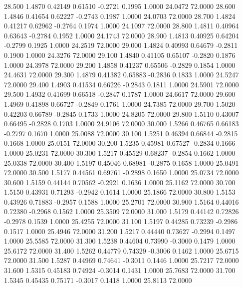   28.500   1.4870   0.42149   0.61510  -0.2721   0.1995   1.0000  24.0472  72.0000
  28.600   1.4846   0.41654   0.62227  -0.2743   0.1987   1.0000  24.0703  72.0000
  28.700   1.4824   0.41217   0.62962  -0.2764   0.1974   1.0000  24.1097  72.0000
  28.800   1.4811   0.40964   0.63643  -0.2784   0.1952   1.0000  24.1743  72.0000
  28.900   1.4813   0.40925   0.64204  -0.2799   0.1925   1.0000  24.2519  72.0000
  29.000   1.4824   0.40993   0.64679  -0.2811   0.1900   1.0000  24.3276  72.0000
  29.100   1.4840   0.41105   0.65107  -0.2820   0.1876   1.0000  24.3978  72.0000
  29.200   1.4858   0.41237   0.65506  -0.2829   0.1854   1.0000  24.4631  72.0000
  29.300   1.4879   0.41382   0.65883  -0.2836   0.1833   1.0000  24.5247  72.0000
  29.400   1.4903   0.41534   0.66226  -0.2843   0.1811   1.0000  24.5901  72.0000
  29.500   1.4932   0.41699   0.66518  -0.2847   0.1787   1.0000  24.6617  72.0000
  29.600   1.4969   0.41898   0.66727  -0.2849   0.1761   1.0000  24.7385  72.0000
  29.700   1.5020   0.42203   0.66789  -0.2845   0.1733   1.0000  24.8205  72.0000
  29.800   1.5110   0.43007   0.66495  -0.2828   0.1703   1.0000  24.9106  72.0000
  30.000   1.5266   0.46765   0.66183  -0.2797   0.1670   1.0000  25.0088  72.0000
  30.100   1.5251   0.46394   0.66844  -0.2815   0.1668   1.0000  25.0151  72.0000
  30.200   1.5235   0.45981   0.67527  -0.2834   0.1666   1.0000  25.0231  72.0000
  30.300   1.5217   0.45529   0.68237  -0.2854   0.1662   1.0000  25.0338  72.0000
  30.400   1.5197   0.45046   0.68981  -0.2875   0.1658   1.0000  25.0491  72.0000
  30.500   1.5177   0.44561   0.69761  -0.2898   0.1650   1.0000  25.0734  72.0000
  30.600   1.5159   0.44144   0.70562  -0.2921   0.1636   1.0000  25.1162  72.0000
  30.700   1.5150   0.43931   0.71293  -0.2942   0.1614   1.0000  25.1866  72.0000
  30.800   1.5153   0.43926   0.71883  -0.2957   0.1588   1.0000  25.2701  72.0000
  30.900   1.5164   0.44016   0.72380  -0.2968   0.1562   1.0000  25.3509  72.0000
  31.000   1.5179   0.44142   0.72826  -0.2978   0.1539   1.0000  25.4255  72.0000
  31.100   1.5197   0.44285   0.73239  -0.2986   0.1517   1.0000  25.4946  72.0000
  31.200   1.5217   0.44440   0.73627  -0.2994   0.1497   1.0000  25.5585  72.0000
  31.300   1.5238   0.44604   0.73990  -0.3000   0.1479   1.0000  25.6172  72.0000
  31.400   1.5262   0.44779   0.74329  -0.3006   0.1462   1.0000  25.6715  72.0000
  31.500   1.5287   0.44969   0.74641  -0.3011   0.1446   1.0000  25.7217  72.0000
  31.600   1.5315   0.45183   0.74924  -0.3014   0.1431   1.0000  25.7683  72.0000
  31.700   1.5345   0.45435   0.75171  -0.3017   0.1418   1.0000  25.8113  72.0000
